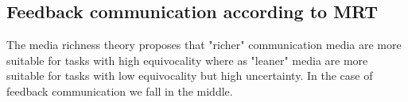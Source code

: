 \documentclass[conference]{IEEEtran}
\begin{document}
\subsection{Feedback communication according to MRT}

The media richness theory proposes that "richer" communication media are more suitable for tasks with high equivocality where as "leaner" media are more suitable for tasks with low equivocality but high uncertainty. \cite{1999dennis} In the case of feedback communication we fall in the middle.

\begin{comment}
\textbf{TODO: Onko palaute yksiselitteisesti equivocality? MST:n mukaan ollaan hieman toisilla jäljillä}

\textbf{TODO: Lue MRT uudestaan ja koita ymmärtää onko just näin. Lue myös Korkalaa ja Bhaleraoa, jotka ovat käyttäneet ko. teoriaa}

In iterative software development various communication phases occur in an iteration. According to Bhalerao these phases are primary, mid- and end-iteration phases. \cite{2010bhalerao}

The primary phases consist of planning tasks. Before the feature implementation, the development team and the customer have to form a shared understanding of what will be implemented. As the consensus is formed it is agreed or documented as a specification for the implementation. In this phase high uncertainty and high equivocality exists. 

In the mid-iteration phase the implementation of the agreed features for the iteration has started. Mid-iteration communication consist of corrective questions regarding the specification. Uncertainty is high while equivocality is low since the high-level consensus has been formed in the previous phase. As the development team starts delivering implemented features feedback communication takes place.

The end-iteration communication consist of feedback communication. The primary task in this phase is to validate the implemtented features. The main method for validation is an iteration demo and customer feedback.

The feedback the customer gives can be unambigious. When a developer interprets the feedback received from customer multiple questions may arise: Are we talking about the same part of the software? Why is this a problem in the first place? How it should be fixed?

Since the feedback can be unambigous and difficult to interpret it can be argued that high equivocality involves in feedback communication. According to media richness theory rich communication methods should be used in feedback communication. Also Bhalerao suggegests the same by arguing that face-to-face communication is the preferred mode for feedback communication for instant feedback \cite{2010bhalerao}.

\end{comment}
\end{document}
